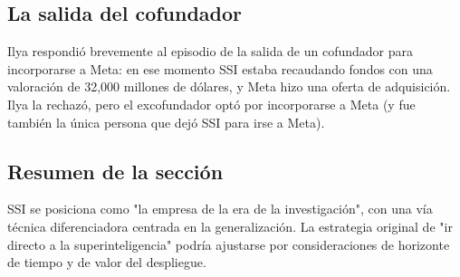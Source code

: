 \subsection{La salida del cofundador}

Ilya respondió brevemente al episodio de la salida de un cofundador para incorporarse a Meta: en ese momento SSI estaba recaudando fondos con una valoración de 32,000 millones de dólares, y Meta hizo una oferta de adquisición. Ilya la rechazó, pero el excofundador optó por incorporarse a Meta (y fue también la única persona que dejó SSI para irse a Meta).

\subsection{Resumen de la sección}

SSI se posiciona como "la empresa de la era de la investigación", con una vía técnica diferenciadora centrada en la generalización. La estrategia original de "ir directo a la superinteligencia" podría ajustarse por consideraciones de horizonte de tiempo y de valor del despliegue.


